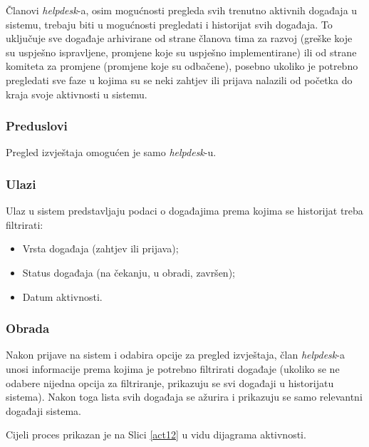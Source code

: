 \documentclass[12pt,a4paper]{article}
\begin{document}
Članovi \textit{helpdesk}-a, osim mogućnosti pregleda svih trenutno aktivnih događaja u sistemu, trebaju biti u mogućnosti pregledati i historijat svih događaja. To uključuje sve događaje arhivirane od strane članova tima za razvoj (greške koje su uspješno ispravljene, promjene koje su uspješno implementirane) ili od strane komiteta za promjene (promjene koje su odbačene), posebno ukoliko je potrebno pregledati sve faze u kojima su se neki zahtjev ili prijava nalazili od početka do kraja svoje aktivnosti u sistemu.

\subsubsection{Preduslovi}

Pregled izvještaja omogućen je samo \textit{helpdesk}-u.

\subsubsection{Ulazi}

Ulaz u sistem predstavljaju podaci o događajima prema kojima se historijat treba filtrirati:

\begin{itemize}
\item Vrsta događaja (zahtjev ili prijava);
\item Status događaja (na čekanju, u obradi, završen);
\item Datum aktivnosti.
\end{itemize}

\subsubsection{Obrada}

Nakon prijave na sistem i odabira opcije za pregled izvještaja, član \textit{helpdesk}-a unosi informacije prema kojima je potrebno filtrirati događaje (ukoliko se ne odabere nijedna opcija za filtriranje, prikazuju se svi događaji u historijatu sistema). Nakon toga lista svih događaja se ažurira i prikazuju se samo relevantni događaji sistema.

Cijeli proces prikazan je na Slici \ref{act12} u vidu dijagrama aktivnosti.
\end{document}
